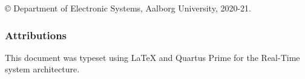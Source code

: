 \hypersetup{pageanchor=false} %
\thispagestyle{empty}
{\small
\strut\vfill
\noindent \copyright{} Department of Electronic Systems, Aalborg University, 2020-21.\par
\vspace{0.3cm}
\subsubsection*{Attributions}
This document was typeset using \LaTeX \hspace{0.05cm} and Quartus Prime for the Real-Time system architecture.
\noindent
}
\clearpage
\hypersetup{pageanchor=true} %